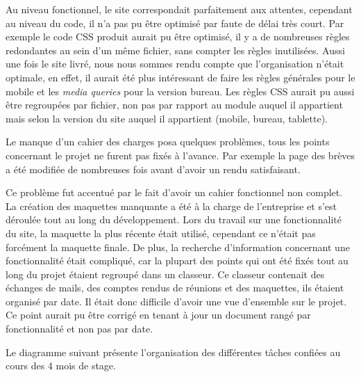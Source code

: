 \documentclass[12pt,a4paper]{article}
\begin{document}
\medskip
Au niveau fonctionnel, le site correspondait parfaitement aux attentes, cependant au niveau du code, il n'a pas pu être optimisé par faute de délai très court. Par exemple le code \gls{CSS} produit aurait pu être optimisé, il y a de nombreuses règles redondantes au sein d'un même fichier, sans compter les règles inutilisées. Aussi une fois le site livré, nous nous sommes rendu compte que l'organisation n'était optimale, en effet, il aurait été plus intéressant de faire les règles générales pour le mobile et les \textit{media queries} pour la version bureau. Les règles \gls{CSS} aurait pu aussi être regroupées par fichier, non pas par rapport au module auquel il appartient mais selon la version du site auquel il appartient (mobile, bureau, tablette).\par
\medskip
Le manque d'un cahier des charges posa quelques problèmes, tous les points concernant le projet ne furent pas fixés à l'avance. Par exemple la page des brèves a été modifiée de nombreuses fois avant d'avoir un rendu satisfaisant.\par 
Ce problème fut accentué par le fait d'avoir un cahier fonctionnel non complet. La création des maquettes manquante a été à la charge de l'entreprise et s'est déroulée tout au long du développement. Lors du travail sur une fonctionnalité du site, la maquette la plus récente était utilisé, cependant ce n'était pas forcément la maquette finale.
De plus, la recherche d'information concernant une fonctionnalité était compliqué, car la plupart des points qui ont été fixés tout au long du projet étaient regroupé dans un classeur. Ce classeur contenait des échanges de mails, des comptes rendus de réunions et des maquettes, ils étaient organisé par date. Il était donc difficile d'avoir une  vue d'ensemble sur le projet. Ce point aurait pu être corrigé en tenant à jour un document rangé par fonctionnalité et non pas par date.\par 
\medskip
Le diagramme suivant présente l'organisation des différentes tâches confiées au cours des 4 mois de stage.
\end{document}

